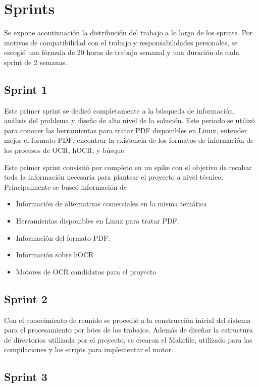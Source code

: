 \section{Sprints}

Se expone acontinuación la distribución del trabajo a lo largo de los sprints. Por motivos de compatibilidad con el trabajo y responsabilidades personales, se escogió una fórmula de 20 horas de trabajo semanal y una duración de cada sprint de 2 semanas.

\subsection{Sprint 1}

Este primer sprint se dedicó completamente a la búsqueda de información, análisis del problema y diseño de alto nivel de la solución. Este periodo se utilizó para conocer las herramientas para tratar PDF disponibles en Linux, entender mejor el formato PDF, encontrar la existencia de los formatos de información de los procesos de OCR, hOCR; y búsque

Este primer sprint consistió por completo en un spike con el objetivo de recabar toda la información necesaria para plantear el proyecto a nivel técnico. Principalmente se buscó información de

\begin{itemize}
    \item Información de alternativas comerciales en la misma temática
    \item Herramientas disponibles en Linux para tratar PDF.
    \item Información del formato PDF.
    \item Información sobre hOCR
    \item Motores de OCR candidatos para el proyecto
\end{itemize}

\subsection{Sprint 2}

Con el conocimiento de reunido se procedió a la construcción inicial del sistema para el procesamiento por lotes de los trabajos. Además de diseñar la estructura de directorios utilizada por el proyecto, se crearon el Makefile, utilizado para las compilaciones y los scripts para implementar el motor.

\subsection{Sprint 3}

